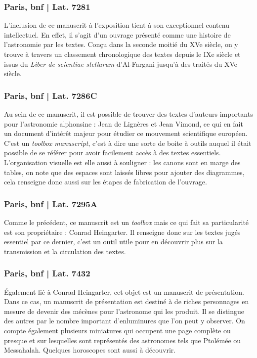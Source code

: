     \subsubsection{Paris, \acrshort{bnf} | Lat. 7281}
    L’inclusion de ce manuscrit à l’exposition tient à son exceptionnel contenu intellectuel. En effet, il s’agit d’un ouvrage présenté comme une histoire de l’astronomie par les textes. Conçu dans la seconde moitié du XVe siècle, on y trouve à travers un classement chronologique des textes depuis le IXe siècle et issus du \textit{Liber de scientiae stellarum} d’Al-Fargani jusqu’à des traités du XVe siècle.

    \subsubsection{Paris, \acrshort{bnf} | Lat. 7286C}
    Au sein de ce manuscrit, il est possible de trouver des textes d’auteurs importants pour l’astronomie alphonsine : Jean de Lignères et Jean Vimond, ce qui en fait un document d’intérêt majeur pour étudier ce mouvement scientifique européen. C’est un \textit{toolbox manuscript}, c’est à dire une sorte de boite à outils auquel il était possible de se référer pour avoir facilement accès à des textes essentiels. L’organisation visuelle est elle aussi à souligner : les canons sont en marge des tables, on note que des espaces sont laissés libres pour ajouter des diagrammes, cela renseigne donc aussi sur les étapes de fabrication de l'ouvrage.

    \subsubsection{Paris, \acrshort{bnf} | Lat. 7295A}
    Comme le précédent, ce manuscrit est un \textit{toolbox} mais ce qui fait sa particularité est son propriétaire : Conrad Heingarter. Il renseigne donc sur les textes jugés essentiel par ce dernier, c’est un outil utile pour en découvrir plus sur la transmission et la circulation des textes. 

    \subsubsection{Paris, \acrshort{bnf} | Lat. 7432}
    Également lié à Conrad Heingarter, cet objet est un manuscrit de présentation. Dans ce cas, un manuscrit de présentation est destiné à de riches personnages en mesure de devenir des mécènes pour l’astronome qui les produit. Il se distingue des autres par le nombre important d’enluminures que l’on peut y observer. On compte également plusieurs miniatures qui occupent une page complète ou presque et sur lesquelles sont représentés des astronomes tels que Ptolémée ou Messahalah. Quelques horoscopes sont aussi à découvrir.
 
